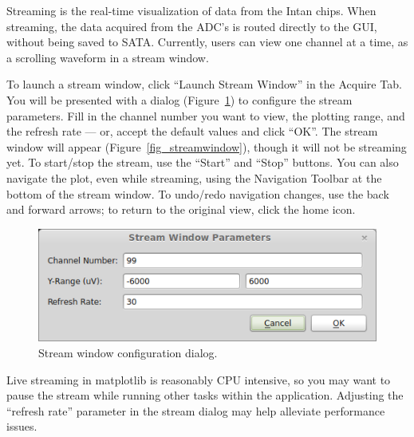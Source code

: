 Streaming is the real-time visualization of data from the Intan chips. When streaming, the data acquired from the ADC's is routed directly to the GUI, without being saved to SATA. Currently, users can view one channel at a time, as a scrolling waveform in a stream window.

To launch a stream window, click ``Launch Stream Window'' in the Acquire Tab. You will be presented with a dialog (Figure~\ref{fig_streamdialog}) to configure the stream parameters. Fill in the channel number you want to view, the plotting range, and the refresh rate --- or, accept the default values and click ``OK''. The stream window will appear (Figure~\ref{fig_streamwindow}), though it will not be streaming yet. To start/stop the stream, use the ``Start'' and ``Stop'' buttons. You can also navigate the plot, even while streaming, using the Navigation Toolbar at the bottom of the stream window. To undo/redo navigation changes, use the back and forward arrows; to return to the original view, click the home icon.

\begin{figure}[h!]
\begin{center}
\includegraphics[width=12cm]{screenshots/streamdialog.png}
\end{center}
\caption{Stream window configuration dialog.}
\label{fig_streamdialog}
\end{figure}

Live streaming in matplotlib is reasonably CPU intensive, so you may want to pause the stream while running other tasks within the application. Adjusting the ``refresh rate'' parameter in the stream dialog may help alleviate performance issues.

